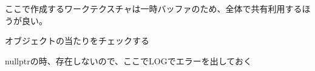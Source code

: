 
\begin{DoxyRefList}
\item[メンバ \mbox{\hyperlink{class_component_filter_fade_a7defc3ca2dfdafe72c6913b3428c3ebb}{Component\+Filter\+Fade\+::Component\+Filter\+Fade}} ()]\label{todo__todo000001}%
%
 ここで作成するワークテクスチャは一時バッファのため、全体で共有利用するほうが良い。  
\item[メンバ \mbox{\hyperlink{class_scene_a8f671924b45a88869ea443f9a5b59563}{Scene\+::Check\+Component\+Collisions}} ()]\label{todo__todo000002}%
%
オブジェクトの当たりをチェックする  
\item[メンバ \mbox{\hyperlink{class_scene_a9e143dc2e860651e852c1b45b0d9b3c3}{Scene\+::Get\+Object\+Ptr}} (std\+::string\+\_\+view name=\char`\"{}\char`\"{})]\label{todo__todo000003}%
%
nullptrの時、存在しないので、ここで\+LOGでエラーを出しておく 
\end{DoxyRefList}